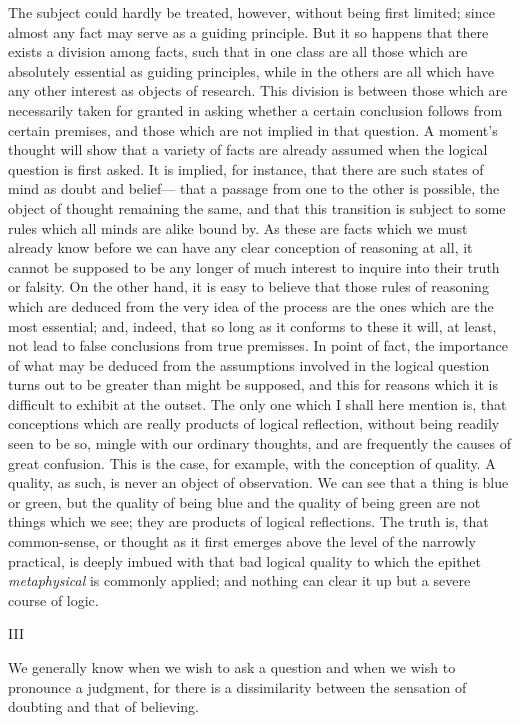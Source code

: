 \documentclass[]{article}
\newcommand*{\itemsection}[1]{\bigskip\centerline{#1}\nopagebreak}
\begin{document}
The subject could hardly be treated, however, without being first limited; since almost any fact may serve as a guiding principle. But it so happens that there exists a division among facts, such that in one class are all those which are absolutely essential as guiding principles, while in the others are all which have any other interest as objects of research. This division is between those which are necessarily taken for granted in asking whether a certain conclusion follows from certain premises, and those which are not implied in that question. A moment's thought will show that a variety of facts are already assumed when the logical question is first asked. It is implied, for instance, that there are such states of mind as doubt and belief--- that a passage from one to the other is possible, the object of thought remaining the same, and that this transition is subject to some rules which all minds are alike bound by. As these are facts which we must already know before we can have any clear conception of reasoning at all, it cannot be supposed to be any longer of much interest to inquire into their truth or falsity. On the other hand, it is easy to believe that those rules of reasoning which are deduced from the very idea of the process are the ones which are the most essential; and, indeed, that so long as it conforms to these it will, at least, not lead to false conclusions from true premisses. In point of fact, the importance of what may be deduced from the assumptions involved in the logical question turns out to be greater than might be supposed, and this for reasons which it is difficult to exhibit at the outset. The only one which I shall here mention is, that conceptions which are really products of logical reflection, without being readily seen to be so, mingle with our ordinary thoughts, and are frequently the causes of great confusion. This is the case, for example, with the conception of quality. A quality, as such, is never an object of observation. We can see that a thing is blue or green, but the quality of being blue and the quality of being green are not things which we see; they are products of logical reflections. The truth is, that common-sense, or thought as it first emerges above the level of the narrowly practical, is deeply imbued with that bad logical quality to which the epithet \emph{metaphysical} is commonly applied; and nothing can clear it up but a severe course of logic.

\itemsection{III}

We generally know when we wish to ask a question and when we wish to pronounce a judgment, for there is a dissimilarity between the sensation of doubting and that of believing.
\end{document}
